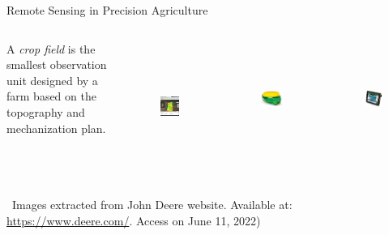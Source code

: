 \documentclass[xcolor=table]{beamer}
\begin{document}
\begin{frame}{ \normalsize Remote Sensing in Precision Agriculture}
		
	\begin{columns}
		    \begin{tcolorbox}[colback=yellow!5,colframe=yellow!75!black]
		    A \textit{crop field} is the smallest observation unit designed by a farm based on the topography and mechanization plan. 
	        \end{tcolorbox}
	        
    		\begin{figure}[htb]
    			\centering
    			\includegraphics[height=3.5cm]{figs/fieldanalyzer.png}
    			\label{fig:textFieldAnalyzer}
    		\end{figure}


    		\begin{figure}[htb]
    			\centering
    			\includegraphics[height=3cm]{figs/gps.png}
    			\label{fig:gps}
    		\end{figure}
    		
    		\begin{figure}[htb]
    			\centering
    			\includegraphics[height=3cm]{figs/display.png}
    			\label{fig:display}
    		\end{figure}

	\end{columns}
	~\flushright \tiny {Images extracted from John Deere website. Available at: \url{https://www.deere.com/}. Access on June 11, 2022})
	
\end{frame}
\end{document}
